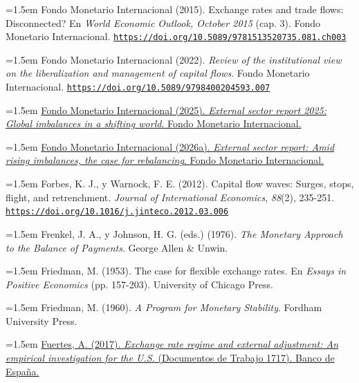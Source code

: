 \documentclass[10pt,a4paper]{article}
\begin{document}
\noindent\hangindent=1.5em Fondo Monetario Internacional (2015). Exchange rates and trade flows: Disconnected? En \textit{World Economic Outlook, October 2015} (cap. 3). Fondo Monetario Internacional. \href{https://doi.org/10.5089/9781513520735.081.ch003}{\nolinkurl{https://doi.org/10.5089/9781513520735.081.ch003}}

\noindent\hangindent=1.5em Fondo Monetario Internacional (2022). \textit{Review of the institutional view on the liberalization and management of capital flows}. Fondo Monetario Internacional. \href{https://doi.org/10.5089/9798400204593.007}{\nolinkurl{https://doi.org/10.5089/9798400204593.007}}

\noindent\hangindent=1.5em \href{https://www.imf.org/en/Publications/ESR/Issues/2025/07/22/external-sector-report-2025}{Fondo Monetario Internacional (2025). \textit{External sector report 2025: Global imbalances in a shifting world}. Fondo Monetario Internacional.}

\noindent\hangindent=1.5em \href{https://www.imf.org/en/Publications/ESR}{Fondo Monetario Internacional (2026a). \textit{External sector report: Amid rising imbalances, the case for rebalancing}. Fondo Monetario Internacional.}

\noindent\hangindent=1.5em Forbes, K. J., y Warnock, F. E. (2012). Capital flow waves: Surges, stops, flight, and retrenchment. \textit{Journal of International Economics}, \textit{88}(2), 235-251. \href{https://doi.org/10.1016/j.jinteco.2012.03.006}{\nolinkurl{https://doi.org/10.1016/j.jinteco.2012.03.006}}

\noindent\hangindent=1.5em Frenkel, J. A., y Johnson, H. G. (eds.) (1976). \textit{The Monetary Approach to the Balance of Payments}. George Allen \& Unwin.

\noindent\hangindent=1.5em Friedman, M. (1953). The case for flexible exchange rates. En \textit{Essays in Positive Economics} (pp. 157-203). University of Chicago Press.

\noindent\hangindent=1.5em Friedman, M. (1960). \textit{A Program for Monetary Stability}. Fordham University Press.

\noindent\hangindent=1.5em \href{https://www.bde.es/wbe/es/publicaciones/analisis-economico-investigacion/documentos-trabajo/exchange-rate-regime-and-external-adjustment-an-empirical-investigation-for-u-s-.html}{Fuertes, A. (2017). \textit{Exchange rate regime and external adjustment: An empirical investigation for the U.S.} (Documentos de Trabajo 1717). Banco de España.}
\end{document}
